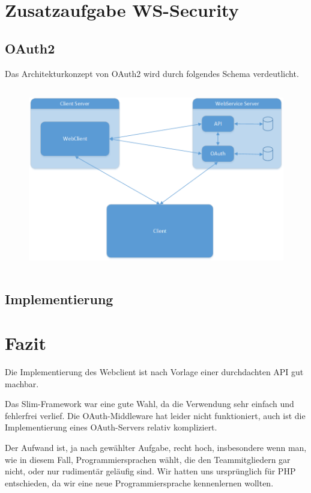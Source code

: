 \chapter{Zusatzaufgabe WS-Security}

\section{OAuth2}

Das Architekturkonzept von OAuth2 wird durch folgendes Schema verdeutlicht.

\begin{figure}[h]
        \centering
	\includegraphics[height=80mm]{pics/Architektur.png}
\end{figure}

\section{Implementierung}

\chapter{Fazit}

Die Implementierung des Webclient ist nach Vorlage einer durchdachten API gut machbar.

Das Slim-Framework war eine gute Wahl, da die Verwendung sehr einfach und fehlerfrei verlief.
Die OAuth-Middleware hat leider nicht funktioniert, auch ist die Implementierung eines OAuth-Servers relativ kompliziert.

Der Aufwand ist, ja nach gewählter Aufgabe, recht hoch, insbesondere wenn man, wie in diesem Fall, Programmiersprachen wählt, die den Teammitgliedern gar nicht, oder nur rudimentär geläufig sind.
Wir hatten uns ursprünglich für PHP entschieden, da wir eine neue Programmiersprache kennenlernen wollten.


